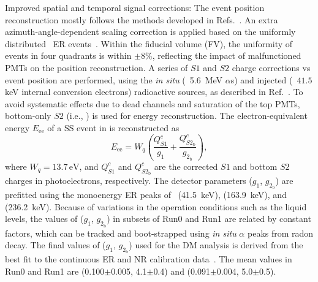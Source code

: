 \documentclass[%
 reprint,
superscriptaddress,
 amsmath,amssymb,
 aps,
 prl,
]{revtex4-1}
\begin{document}
Improved spatial and temporal signal corrections: 
The event position reconstruction mostly follows the methods developed in Refs.~\cite{Zhang2021_PosRecon, Meng2021_P4First}.
An extra azimuth-angle-dependent scaling correction is applied based on the uniformly distributed \, ER events~\cite{Luo2024_P4SignalModel}. 
Within the fiducial volume (FV), the uniformity of \, events in four quadrants is within $\pm8\%$, reflecting the impact of malfunctioned PMTs on the position reconstruction.
A series of $S1$ and $S2$ charge corrections vs event position are performed, using the {\it in situ}
(\, 5.6~MeV $\alpha$s) and injected (\, $41.5$ keV internal conversion electrons) radioactive sources, as described in Ref.~\cite{Luo2024_P4SignalModel}. 
To avoid systematic effects due to dead channels and saturation of the top PMTs, bottom-only $S2$ (i.e., ) is used for energy reconstruction.
The electron-equivalent energy $E_\mathrm{ee}$ of a SS event in \PX is reconstructed as
\begin{equation}
    E_\mathrm{ee} = W_q \left(\frac{Q^c_{S1}}{g_1}+\frac{Q^c_{S2_\mathrm{b}}}{g_{2_\mathrm{b}}}\right),
\label{eq:doke}
\end{equation}
where $W_q = 13.7\,\mathrm{eV}$, and $Q^c_{S1}$ and $Q^c_{S2_\mathrm{b}}$ are the corrected $S1$ and bottom $S2$ charges in photoelectrons, respectively.
The detector parameters ($g_1$, $g_{2_\mathrm{b}}$) are prefitted using the monoenergy ER peaks of  
\, (41.5~keV),  (163.9~keV), and  (236.2~keV). Because of variations in the operation conditions such as the liquid levels, the values of ($g_1$, $g_{2_\mathrm{b}}$) in subsets of Run0 and Run1 are related by constant factors, which can be tracked and boot-strapped using {\it in situ} $\alpha$ peaks from radon decay. The final values of ($g_1$, $g_{2_\mathrm{b}}$) 
used for the DM analysis is derived from the best fit to the continuous ER 
and NR 
calibration data~\cite{Luo2024_P4SignalModel}.
The mean values in Run0 and Run1 are (0.100$\pm$0.005, 4.1$\pm$0.4) and (0.091$\pm$0.004, 5.0$\pm$0.5).
\end{document}
